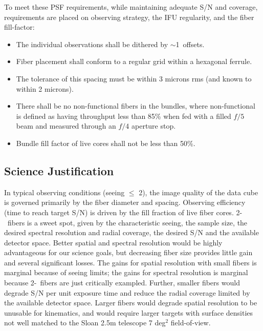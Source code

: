 \documentclass[preprint,11pt]{aastex}
\begin{document}
\medskip
\noindent To meet these PSF requirements, while maintaining adequate
S/N and coverage, requirements are placed on observing
strategy, the IFU regularity, and the fiber fill-factor:

\begin{itemize}

\item The individual observations shall be dithered by $\sim$1\arcsec\
  offsets.

\item Fiber placement shall conform to a regular grid within a
  hexagonal ferrule.  

\item The tolerance of this spacing must be within 3 microns rms (and
  known to within 2 microns).

\item There shall be no non-functional fibers in the bundles, where
  non-functional is defined as having throughput less than 85\% when
  fed with a filled $f/5$ beam and measured through an $f/4$ aperture
  stop.

\item Bundle fill factor of live cores shall not be less than 50\%.

\end{itemize}

\subsection{Science Justification}

In typical observing conditions (seeing $\leq$ 2\arcsec), the image
quality of the data cube is governed primarily by the fiber diameter
and spacing. Observing efficiency (time to reach target S/N) is driven
by the fill fraction of live fiber cores. 2-\arcsec\ fibers is a sweet
spot, given by the characteristic seeing, the sample size, the desired
spectral resolution and radial coverage, the desired S/N and the
available detector space.  Better spatial and spectral resolution
would be highly advantageous for our science goals, but decreasing
fiber size provides little gain and several significant losses.  The
gains for spatial resolution with small fibers is marginal because of
seeing limits; the gains for spectral resolution is marginal because
2-\arcsec\ fibers are just critically exampled.  Further, smaller
fibers would degrade S/N per unit exposure time and reduce the radial
coverage limited by the available detector space. Larger fibers would
degrade spatial resolution to be unusable for kinematics, and would
require larger targets with surface densities not well matched to the
Sloan 2.5m telescope 7 deg$^2$ field-of-view.
\end{document}

